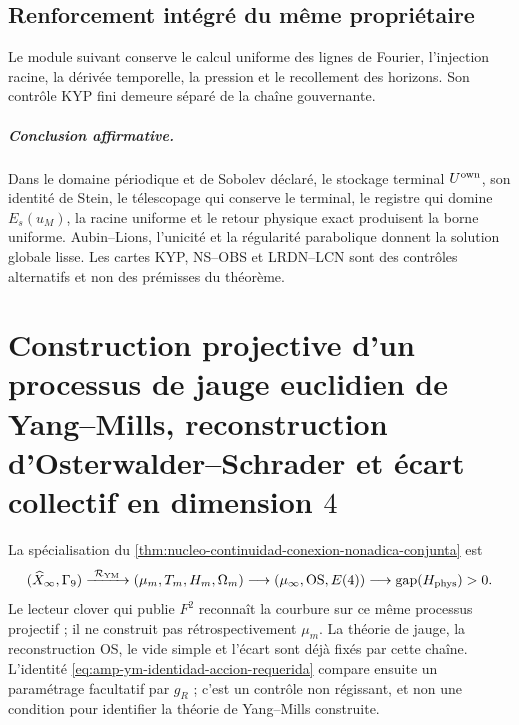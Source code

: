 


\section*{Renforcement intégré du même propriétaire}

Le module suivant conserve le calcul uniforme des lignes de Fourier,
l'injection racine, la dérivée temporelle, la pression et le recollement des
horizons. Son contrôle KYP fini demeure séparé de la chaîne gouvernante.



\paragraph{Conclusion affirmative.}
Dans le domaine périodique et de Sobolev déclaré, le stockage terminal
\(U^{\rm own}\), son identité de Stein, le télescopage qui conserve le
terminal, le registre qui domine \(E_s(u_M)\), la racine uniforme et le retour
physique exact produisent la borne uniforme. Aubin--Lions, l'unicité et la
régularité parabolique donnent la solution globale lisse. Les cartes KYP,
NS--OBS et LRDN--LCN sont des contrôles alternatifs et non des prémisses du théorème.

\chapter[Processus de jauge euclidien de Yang--Mills en dimension 4]{Construction
projective d’un processus de jauge euclidien de Yang--Mills, reconstruction
d’Osterwalder--Schrader et écart collectif en dimension \(4\)}

\noindent La spécialisation du
\cref{thm:nucleo-continuidad-conexion-nonadica-conjunta} est
\[
 (\widehat X_\infty,\Gamma_9)
 \xrightarrow{\ \mathcal R_{\rm YM}\ }
 (\mu_m,T_m,H_m,\Omega_m)
 \longrightarrow(\mu_\infty,\mathrm{OS},E(4))
 \longrightarrow\operatorname{gap}(H_{\rm phys})>0.
\]
Le lecteur clover qui publie \(F^2\) reconnaît la courbure sur ce même
processus projectif ; il ne construit pas rétrospectivement \(\mu_m\). La théorie
de jauge, la reconstruction OS, le vide simple et l’écart sont déjà fixés
par cette chaîne. L’identité
\eqref{eq:amp-ym-identidad-accion-requerida} compare ensuite un
paramétrage facultatif par \(g_R\) ; c’est un contrôle non régissant, et non une
condition pour identifier la théorie de Yang--Mills construite.

